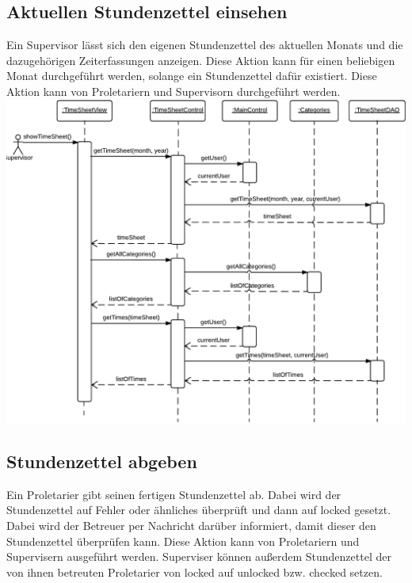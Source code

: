     \newpage
    \subsection{Aktuellen Stundenzettel einsehen}
        Ein Supervisor lässt sich den eigenen Stundenzettel des aktuellen Monats und die dazugehörigen Zeiterfassungen anzeigen.
        Diese Aktion kann für einen beliebigen Monat durchgeführt werden, solange ein Stundenzettel dafür existiert.
        Diese Aktion kann von Proletariern und Supervisorn durchgeführt werden.\\

        \includegraphics[width=\linewidth]{Diagramms/sequenzes/current_timesheet.pdf}

    \newpage
    \subsection{Stundenzettel abgeben}
        Ein Proletarier gibt seinen fertigen Stundenzettel ab.
        Dabei wird der Stundenzettel auf Fehler oder ähnliches überprüft und dann auf locked gesetzt.
        Dabei wird der Betreuer per Nachricht darüber informiert, damit dieser den Stundenzettel überprüfen kann.
        Diese Aktion kann von Proletariern und Supervisern ausgeführt werden.
        Superviser können außerdem Stundenzettel der von ihnen betreuten Proletarier von locked auf unlocked bzw. checked setzen.\\

